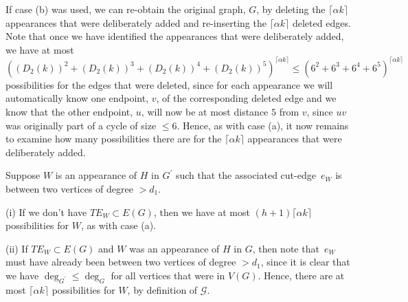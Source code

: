 \documentclass{article}
\newtheorem{Proof of Theorem}{Proof of Theorem}
\begin{document}
If case (b) was used,
we can re-obtain the original graph, $G$,
by deleting the $\lceil \alpha k \rceil$ appearances that were deliberately added
and re-inserting the $\lceil \alpha k \rceil$ deleted edges.
Note that once we have identified the appearances that were deliberately added,
we have at most 
$\left( (D_{2}(k))^{2}+(D_{2}(k))^{3}+(D_{2}(k))^{4}+(D_{2}(k))^{5} \right)^{\lceil \alpha k \rceil}
\leq (6^{2}+ 6^{3}+ 6^{4}+ 6^{5})^{\lceil \alpha k \rceil}$
possibilities for the edges that were deleted,
since for each appearance we will automatically know one endpoint, $v$, of the corresponding deleted edge
and we know that the other endpoint, $u$,
will now be at most distance $5$ from $v$,
since $uv$ was originally part of a cycle of size $\leq 6$.
Hence, as with case (a), 
it now remains to examine how many possibilities there are for the $\lceil \alpha k \rceil$ appearances
that were deliberately added.

Suppose $W$ is an appearance of $H$ in $G^{\prime}$ such that the associated cut-edge~$e_{W}$
is between two vertices of degree $>d_{1}$.

(i) If we don't have $TE_{W} \subset E(G)$,
then we have at most $(h+1) \lceil \alpha k \rceil$ possibilities for $W$,
as with case (a).

(ii) If $TE_{W} \subset E(G)$ 
and $W$ was an appearance of $H$ in $G$,
then note that~$e_{W}$ must have already been between two vertices of degree $>d_{1}$,
since it is clear that we have $\deg_{G^{\prime}} \leq \deg_{G}$
for all vertices that were in $V(G)$.
Hence, there are at most $\lceil \alpha k \rceil$ possibilities for $W$,
by definition of $\mathcal{G}$.
\end{document}

